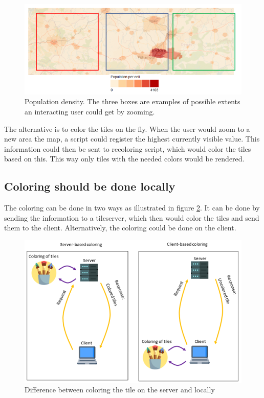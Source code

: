 \begin{figure} [H]
	\centering
	\includegraphics[width=.8\textwidth]{Pictures/WhyNotPrecolor}
	\caption{Population density. The three boxes are examples of possible extents an interacting user could get by zooming.}
	\label{WhyNotPrecolor}
\end{figure}

The alternative is to color the tiles on the fly. When the user would zoom to a new area the map, a script could register the highest currently visible value. This information could then be sent to recoloring script, which would color the tiles based on this. This way only tiles with the needed colors would be rendered. 


\subsection{Coloring should be done locally}
The coloring can be done in two ways as illustrated in figure \ref{WhyColorLocally}. It can be done by sending the information to a tileserver, which then would color the tiles and send them to the client. Alternatively, the coloring could be done on the client. 

\begin{figure} [H]
	\centering
	\includegraphics[width=.8\textwidth]{Pictures/WhyColorLocally}
	\caption{Difference between coloring the tile on the server and locally}
	\label{WhyColorLocally}
\end{figure}


